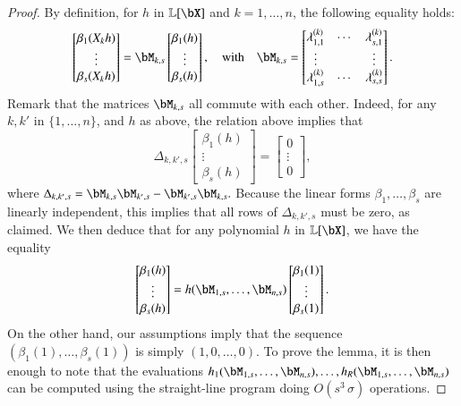 \documentclass[amsthm]{elsart}
\begin{document}
\begin{proof}
  By definition, for $h$ in $\LL[\bX]$ and $k=1,\dots,n$, the following equality
  holds:
$$
  \begin{bmatrix}
    \beta_1(X_k h)\\
    \vdots\\
    \beta_s(X_k h)
  \end{bmatrix}=
\bM_{k,s}
  \begin{bmatrix}
    \beta_1(h)\\
    \vdots\\
    \beta_s(h)
  \end{bmatrix},
\quad\text{with}\quad
\bM_{k,s}= \begin{bmatrix}
    \lambda^{(k)}_{1,1} & \cdots & \lambda^{(k)}_{s,1}\\
    \vdots && \vdots \\
    \lambda^{(k)}_{1,s} & \cdots & \lambda^{(k)}_{s,s}
  \end{bmatrix}.
$$ 
 Remark that the matrices $\bM_{k,s}$ all commute with each other. Indeed, 
for any $k,k'$ in $\{1,\dots,n\}$, and $h$ as above, the relation above implies
that 
$$
\Delta_{k,k',s}
  \begin{bmatrix}
    \beta_1(h)\\
    \vdots\\
    \beta_s(h)
  \end{bmatrix} =
  \begin{bmatrix}
0\\ \vdots \\ 0 
  \end{bmatrix},
$$
where $\Delta_{k,k',s} = \bM_{k,s}\bM_{k',s}-\bM_{k',s}\bM_{k,s}.$ Because 
the linear forms $\beta_1,\dots,\beta_s$ are linearly independent, this implies
that all rows of $\Delta_{k,k',s}$ must be zero, as claimed.
We then deduce that for any polynomial $h$ in $\LL[\bX]$, we have
the equality
$$  \begin{bmatrix}
    \beta_1(h)\\
    \vdots\\
    \beta_s(h)
  \end{bmatrix} =
h(\bM_{1,s},\dots,\bM_{n,s})   \begin{bmatrix}
    \beta_1(1)\\
    \vdots\\
    \beta_s(1)
  \end{bmatrix}. $$ On the other hand, our assumptions imply that the
  sequence $(\beta_1(1),\dots,\beta_s(1))$ is simply $(1,0,\dots,0)$.
  To prove the lemma, it is then enough to note that the evaluations \sloppy
  $h_1(\bM_{1,s},\dots,\bM_{n,s}),\dots,h_R(\bM_{1,s},\dots,\bM_{n,s})$
  can be computed using the straight-line program doing
  $O(s^3\,\sigma)$ operations.
\end{proof}
\end{document}

